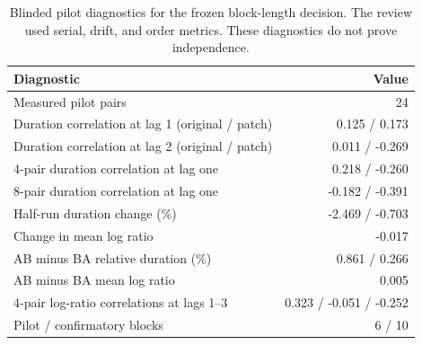 \begin{table}[!htbp]\centering\small
\caption{Blinded pilot diagnostics for the frozen block-length decision. The review used serial, drift, and order metrics. These diagnostics do not prove independence.}
\begin{tabular}{lr}\toprule
Diagnostic & Value\\\midrule
Measured pilot pairs & 24\\
Duration correlation at lag 1 (original / patch) & 0.125 / 0.173\\
Duration correlation at lag 2 (original / patch) & 0.011 / -0.269\\
4-pair duration correlation at lag one & 0.218 / -0.260\\
8-pair duration correlation at lag one & -0.182 / -0.391\\
Half-run duration change (\%) & -2.469 / -0.703\\
Change in mean log ratio & -0.017\\
AB minus BA relative duration (\%) & 0.861 / 0.266\\
AB minus BA mean log ratio & 0.005\\
4-pair log-ratio correlations at lags 1--3 & 0.323 / -0.051 / -0.252\\
Pilot / confirmatory blocks & 6 / 10\\
\bottomrule\end{tabular}\end{table}
